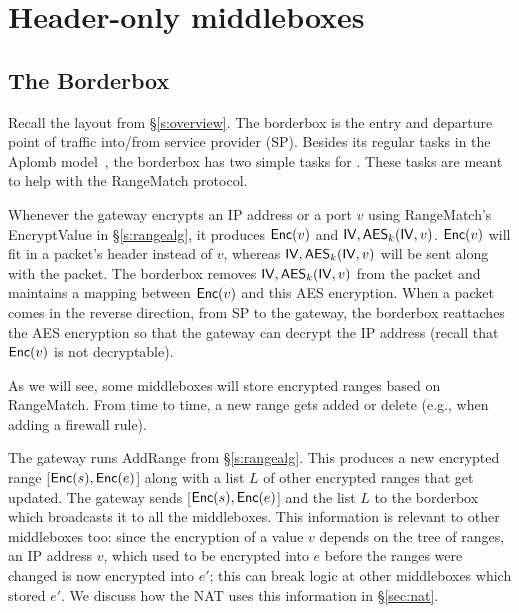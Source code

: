 

\section{Header-only middleboxes}


\subsection{The Borderbox}

Recall the layout from \S\ref{s:overview}. 
The borderbox is the entry and departure point of traffic into/from service provider (SP). Besides its regular tasks in the Aplomb model~\cite{aplomb}, 
the borderbox has two simple tasks for \sys. These tasks are meant to help with the RangeMatch protocol.

 Whenever the gateway encrypts an IP address or a port $v$ using RangeMatch's EncryptValue in \S\ref{s:rangealg}, it 
produces $\mathsf{Enc}(v)$ and $\mathsf{IV}, \mathsf{AES}_k(\mathsf{IV}, v)$.
 $\mathsf{Enc}(v)$ will fit in a packet's header instead of $v$, whereas $\mathsf{IV}, \mathsf{AES}_k(\mathsf{IV}, v)$ will be sent along with the packet. The borderbox
 removes $\mathsf{IV}, \mathsf{AES}_k(\mathsf{IV}, v)$ from the packet and maintains a mapping between $\mathsf{Enc}(v)$  and this AES encryption. 
When a packet comes in the reverse direction, from SP to the gateway, the borderbox reattaches the AES encryption so that the
gateway can decrypt the IP address (recall that $\mathsf{Enc}(v)$ is not decryptable). 

 As we will see, some middleboxes will store encrypted ranges based on RangeMatch. From time to time, a new range gets added or delete (e.g., when adding 
 a firewall rule). 
 
 
 The gateway runs AddRange from \S\ref{s:rangealg}. This produces a new encrypted range [$\mathsf{Enc}(s), \mathsf{Enc}(e)$] 
along with a list $L$ of other encrypted ranges that get updated. The gateway sends [$\mathsf{Enc}(s), \mathsf{Enc}(e)$] 
 and the list $L$ to the borderbox which broadcasts it to all the middleboxes.
This information is relevant to other middleboxes too: since the encryption of a value $v$ depends on the tree of ranges, an IP address $v$, which used to be encrypted into $e$ before the ranges were changed is now encrypted into $e'$; this can break logic at other middleboxes which stored $e'$. We discuss how the NAT uses this information in \S\ref{sec:nat}.

